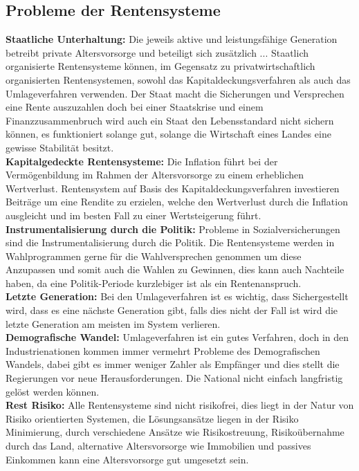 \subsection{Probleme der Rentensysteme}

\textbf{Staatliche Unterhaltung:} Die jeweils aktive und leistungsfähige Generation betreibt private Altersvorsorge und beteiligt sich zusätzlich ...
Staatlich organisierte Rentensysteme können, im Gegensatz zu privatwirtschaftlich organisierten Rentensystemen, sowohl das Kapitaldeckungsverfahren als auch das Umlageverfahren verwenden. 
Der Staat macht die Sicherungen und Versprechen eine Rente auszuzahlen doch bei einer Staatskrise und einem Finanzzusammenbruch wird auch ein Staat den Lebensstandard nicht sichern können, es funktioniert solange gut, solange die Wirtschaft eines Landes eine gewisse Stabilität besitzt.\\
\textbf{Kapitalgedeckte Rentensysteme:} Die Inflation führt bei der Vermögenbildung im Rahmen der Altersvorsorge zu einem erheblichen Wertverlust. 
Rentensystem auf Basis des Kapitaldeckungsverfahren investieren Beiträge um eine Rendite zu erzielen, welche den Wertverlust durch die Inflation ausgleicht und im besten Fall zu einer Wertsteigerung führt. \\
\textbf{Instrumentalisierung durch die Politik:} Probleme in Sozialversicherungen sind die Instrumentalisierung durch die Politik.
Die Rentensysteme werden in Wahlprogrammen gerne für die Wahlversprechen genommen um diese Anzupassen und somit auch die Wahlen zu Gewinnen, dies kann auch Nachteile haben, da eine Politik-Periode kurzlebiger ist als ein Rentenanspruch. \\
\textbf{Letzte Generation:} Bei den Umlageverfahren ist es wichtig, dass Sichergestellt wird, dass es eine nächste Generation gibt, falls dies nicht der Fall ist wird die letzte Generation am meisten im System verlieren.\\
\textbf{Demografische Wandel:} Umlageverfahren ist ein gutes Verfahren, doch in den Industrienationen kommen immer vermehrt Probleme des Demografischen Wandels, dabei gibt es immer weniger Zahler als Empfänger und dies stellt die Regierungen vor neue Herausforderungen. Die National nicht einfach langfristig gelöst werden können. \\
\textbf{Rest Risiko:} Alle Rentensysteme sind nicht risikofrei, dies liegt in der Natur von Risiko orientierten Systemen, die Lösungsansätze liegen in der Risiko Minimierung, durch verschiedene Ansätze wie Risikostreuung, Risikoübernahme durch das Land, alternative Altersvorsorge wie Immobilien und passives Einkommen kann eine Altersvorsorge gut umgesetzt sein.


